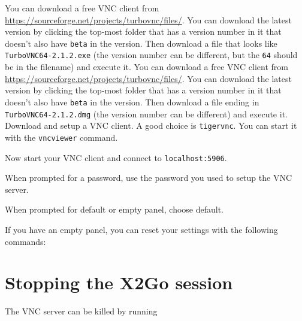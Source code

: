 You can download a free VNC client from \url{https://sourceforge.net/projects/turbovnc/files/}.
You can download the latest version by clicking the top-most folder that has a version number
in it that doesn't also have \lstinline|beta| in the version. Then download a file that looks like
\lstinline|TurboVNC64-2.1.2.exe| (the version number can be different, but the \lstinline|64|
should be in the filename) and execute it.
\fi
\ifmac
You can download a free VNC client from \url{https://sourceforge.net/projects/turbovnc/files/}.
You can download the latest version by clicking the top-most folder that has a version number
in it that doesn't also have \lstinline|beta| in the version. Then download a file ending in
\lstinline|TurboVNC64-2.1.2.dmg| (the version number can be different) and execute it.
\fi
\iflinux
Download and setup a VNC client. A good choice is \lstinline|tigervnc|. You can start
it with the \lstinline|vncviewer| command.
\fi

Now start your VNC client and connect to \lstinline|localhost:5906|.

When prompted for a password, use the password you used to setup the VNC server.

When prompted for default or empty panel, choose default.

If you have an empty panel, you can reset your settings with the following commands:


\section{Stopping the X2Go session}
\label{sec:stop-x2go}

The VNC server can be killed by running


